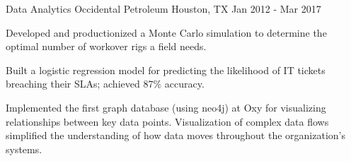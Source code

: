 \begin{cventries}

\cventry
{Data Analytics} %
{Occidental Petroleum} %
{Houston, TX} %
{Jan 2012 - Mar 2017} %
{ %
\begin{cvitems}
\item {Developed and productionized a Monte Carlo simulation to determine the optimal number of workover rigs a field needs.}
\item {Built a logistic regression model for predicting the likelihood of IT tickets breaching their SLAs; achieved 87\% accuracy.}
\item {Implemented the first graph database (using neo4j) at Oxy for visualizing relationships between key data points. Visualization of 
        complex data flows simplified the understanding of how data moves throughout the organization's systems.}
\end{cvitems}
}



\end{cventries}